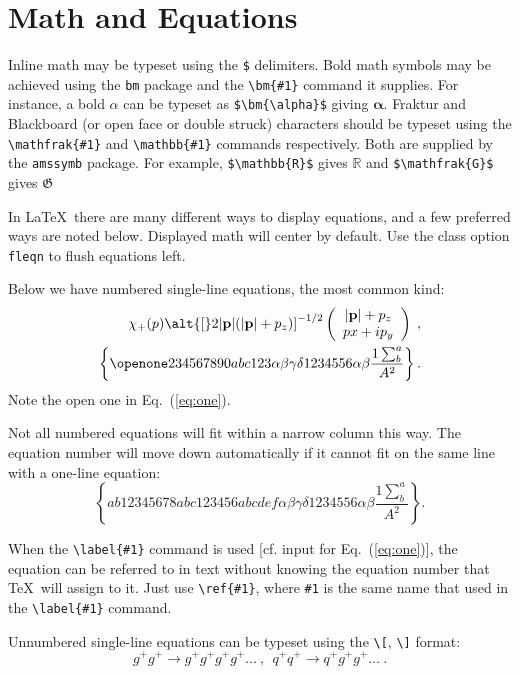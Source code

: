 \documentclass[%
 aip,
 jmp,%
 amsmath,amssymb,
 reprint,%
]{revtex4-1}
\begin{document}
\section{Math and Equations}
Inline math may be typeset using the \verb+$+ delimiters. Bold math
symbols may be achieved using the \verb+bm+ package and the
\verb+\bm{#1}+ command it supplies. For instance, a bold $\alpha$ can
be typeset as \verb+$\bm{\alpha}$+ giving $\bm{\alpha}$. Fraktur and
Blackboard (or open face or double struck) characters should be
typeset using the \verb+\mathfrak{#1}+ and \verb+\mathbb{#1}+ commands
respectively. Both are supplied by the \texttt{amssymb} package. For
example, \verb+$\mathbb{R}$+ gives $\mathbb{R}$ and
\verb+$\mathfrak{G}$+ gives $\mathfrak{G}$

In \LaTeX\ there are many different ways to display equations, and a
few preferred ways are noted below. Displayed math will center by
default. Use the class option \verb+fleqn+ to flush equations left.

Below we have numbered single-line equations, the most common kind: 
\begin{eqnarray}
\chi_+(p)\alt{\bf [}2|{\bf p}|(|{\bf p}|+p_z){\bf ]}^{-1/2}
\left(
\begin{array}{c}
|{\bf p}|+p_z\\
px+ip_y
\end{array}\right)\;,
\\
\left\{%
 \openone234567890abc123\alpha\beta\gamma\delta1234556\alpha\beta
 \frac{1\sum^{a}_{b}}{A^2}%
\right\}%
\label{eq:one}.
\end{eqnarray}
Note the open one in Eq.~(\ref{eq:one}).

Not all numbered equations will fit within a narrow column this
way. The equation number will move down automatically if it cannot fit
on the same line with a one-line equation:
\begin{equation}
\left\{
 ab12345678abc123456abcdef\alpha\beta\gamma\delta1234556\alpha\beta
 \frac{1\sum^{a}_{b}}{A^2}%
\right\}.
\end{equation}

When the \verb+\label{#1}+ command is used [cf. input for
Eq.~(\ref{eq:one})], the equation can be referred to in text without
knowing the equation number that \TeX\ will assign to it. Just
use \verb+\ref{#1}+, where \verb+#1+ is the same name that used in
the \verb+\label{#1}+ command.

Unnumbered single-line equations can be typeset
using the \verb+\[+, \verb+\]+ format:
\[g^+g^+ \rightarrow g^+g^+g^+g^+ \dots ~,~~q^+q^+\rightarrow
q^+g^+g^+ \dots ~. \]
\end{document}
